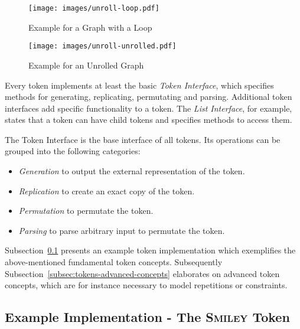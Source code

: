 \begin{figure}[ht]
\texttt{[image: images/unroll-loop.pdf]}
\caption{Example for a Graph with a Loop}
\label{fig:unroll-loop}
\end{figure}

\begin{figure}[ht]
\texttt{[image: images/unroll-unrolled.pdf]}
\caption{Example for an Unrolled Graph}
\label{fig:unroll-unrolled}
\end{figure}

Every token implements at least the basic \emph{Token Interface}, which specifies methods for generating, replicating, permutating and parsing. Additional token interfaces add specific functionality to a token. The \emph{List Interface}, for example, states that a token can have child tokens and specifies methods to access them.

The Token Interface is the base interface of all tokens. Its operations can be grouped into the following categories:

\begin{itemize}
\item \textit{Generation} to output the external representation of the token.
\item \textit{Replication} to create an exact copy of the token.
\item \textit{Permutation} to permutate the token.
\item \textit{Parsing} to parse arbitrary input to permutate the token.
\end{itemize}

Subsection~\ref{subsec:tokens-smiley} presents an example token implementation which exemplifies the above-mentioned fundamental token concepts. Subsequently Subsection~\ref{subsec:tokens-advanced-concepts} elaborates on advanced token concepts, which are for instance necessary to model repetitions or constraints.

\subsection{Example Implementation - The \textsc{Smiley} Token}
\label{subsec:tokens-smiley}

